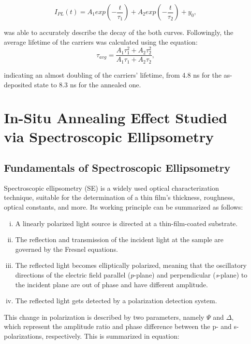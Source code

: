 \begin{equation}
    I_{PL}(t) = A_1exp(-\frac{t}{\tau_1}) + A_2exp(-\frac{t}{\tau_2}) + y_0,
\end{equation}

was able to accurately describe the decay of the both curves. Followingly, the average lifetime of the carriers was calculated using the equation: 
\begin{equation}
    \tau_{avg} = \frac{A_1 \tau_1^2 + A_2 \tau_2^2}{A_1 \tau_1 + A_2 \tau_2},
\end{equation}

indicating an almost doubling of the carriers' lifetime, from 4.8 ns for the as-deposited state to 8.3 ns for the annealed one.

\section{In-Situ Annealing Effect Studied via Spectroscopic Ellipsometry}

\subsection{Fundamentals of Spectroscopic Ellipsometry} \label{ch:ellipsometry:intro}


Spectroscopic ellipsometry (SE) is a widely used optical characterization technique, suitable for the determination of a thin film's thickness, roughness, optical constants, and more. Its working principle can be summarized as follows: 

\begin{enumerate}[i.]
  \item A linearly polarized light source is directed at a thin-film-coated substrate.
  \item The reflection and transmission of the incident light at the sample are governed by the Fresnel equations.
  \item The reflected light becomes elliptically polarized, meaning that the oscillatory directions of the electric field parallel (\textit{p}-plane) and perpendicular (\textit{s}-plane) to the incident plane are out of phase and have different amplitude.
  \item The reflected light gets detected by a polarization detection system.
\end{enumerate}

This change in polarization is described by two parameters, namely $\Psi$ and $\Delta$, which represent the amplitude ratio and phase difference between the p- and s-polarizations, respectively. This is summarized in equation: 


